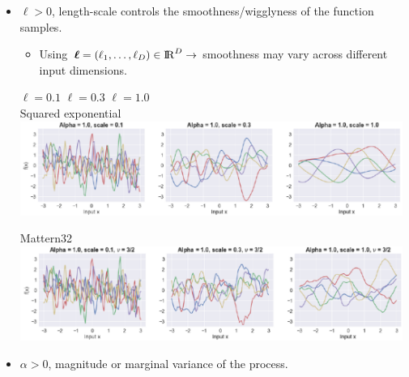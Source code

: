 \documentclass[8pt]{beamer} %
\begin{document}
\begin{frame}

\begin{itemize}
\item $\ell > 0$,\: {\color{navyblue} length-scale} controls the {\color{navyblue} smoothness/wigglyness} of the function samples.\\[1mm]

\begin{itemize}\setlength\itemsep{0mm}
\item Using\, $\bm{\ell}=(\ell_1,\dots,\ell_D)\in {\rm I\!R}^D \rightarrow$  smoothness may vary across different input dimensions.
\end{itemize}

\vspace{1mm}
\begin{adjustwidth}{-3em}{-1em}

{ \color{black} \hspace{17mm} \centering $\ell=0.1$ \hspace{30mm} $\ell=0.3$ \hspace{30mm} $\ell=1.0$} \\[-4pt]
{\scriptsize \color{black} Squared exponential} \\
\includegraphics[width=12.5cm, trim = 0mm 3mm 0mm 5mm, clip]{covfun_fig5.pdf}

{\scriptsize \color{black} Mattern32}\\[1mm]
\includegraphics[width=12.5cm, trim = 0mm 0mm 0mm 5mm, clip]{covfun_fig6.pdf}

\end{adjustwidth}

\item $\alpha > 0$,\: {\color{navyblue} magnitude} or marginal variance of the process.
\end{itemize}
\end{frame}
\end{document}
